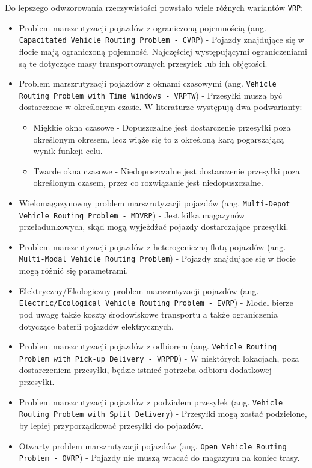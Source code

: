 Do lepszego odwzorowania rzeczywistości powstało wiele różnych wariantów \texttt{VRP}:

\begin{itemize}
    \item Problem marszrutyzacji pojazdów z ograniczoną pojemnością (ang. \texttt{Capacitated Vehicle Routing Problem - CVRP}) - Pojazdy znajdujące się w flocie mają ograniczoną pojemność. Najczęściej występującymi ograniczeniami są te dotyczące masy transportowanych przesyłek lub ich objętości.
    \item Problem marszrutyzacji pojazdów z oknami czasowymi (ang. \texttt{Vehicle Routing Problem with Time Windows - VRPTW}) - Przesyłki muszą być dostarczone w określonym czasie. W literaturze występują dwa podwarianty: \begin{itemize}
        \item Miękkie okna czasowe - Dopuszczalne jest dostarczenie przesyłki poza określonym okresem, lecz wiąże się to z określoną karą pogarszającą wynik funkcji celu.
        \item Twarde okna czasowe - Niedopuszczalne jest dostarczenie przesyłki poza określonym czasem, przez co rozwiązanie jest niedopuszczalne.
    \end{itemize}
    \item Wielomagazynowny problem marszrutyzacji pojazdów (ang. \texttt{Multi-Depot Vehicle Routing Problem - MDVRP}) - Jest kilka magazynów przeładunkowych, skąd mogą wyjeżdżać pojazdy dostarczające przesyłki.
    \item Problem marszrutyzacji pojazdów z heterogeniczną flotą pojazdów (ang. \texttt{Multi-Modal Vehicle Routing Problem}) - Pojazdy znajdujące się w flocie mogą różnić się parametrami.
    \item Elektryczny/Ekologiczny problem marszrutyzacji pojazdów (ang. \texttt{Electric/Ecological Vehicle Routing Problem - EVRP}) - Model bierze pod uwagę także koszty środowiskowe transportu a także ograniczenia dotyczące baterii pojazdów elektrycznych.
    \item Problem marszrutyzacji pojazdów z odbiorem (ang. \texttt{Vehicle Routing Problem with Pick-up Delivery - VRPPD}) - W niektórych lokacjach, poza dostarczeniem przesyłki, będzie istnieć potrzeba odbioru dodatkowej przesyłki.
    \item Problem marszrutyzacji pojazdów z podziałem przesyłek (ang. \texttt{Vehicle Routing Problem with Split Delivery}) - Przesyłki mogą zostać podzielone, by lepiej przyporządkować przesyłki do pojazdów.
    \item Otwarty problem marszrutyzacji pojazdów (ang. \texttt{Open Vehicle Routing Problem - OVRP}) - Pojazdy nie muszą wracać do magazynu na koniec trasy.

\end{itemize}
